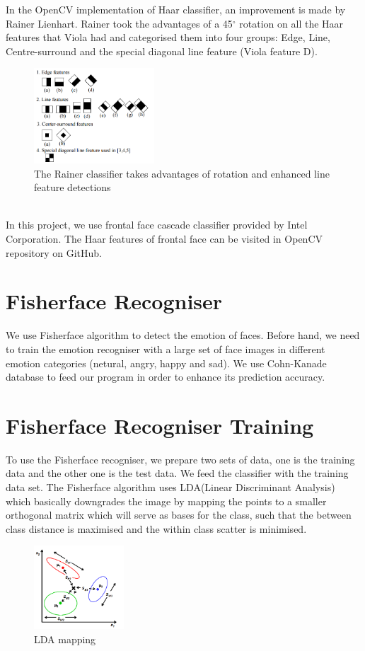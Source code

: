 \documentclass[10pt,a4paper]{article}
\begin{document}
	In the OpenCV implementation of Haar classifier, an improvement is made by Rainer Lienhart. Rainer took the advantages of a 45$^{\circ}$ rotation on all the Haar features
that Viola had and categorised them into four groups: Edge, Line, Centre-surround and the special diagonal line feature (Viola feature D).
	\begin{figure}[!ht]
  	\centering
      	\includegraphics[width=0.4\textwidth]{Rainer_Detector.png}
  	\caption{The Rainer classifier takes advantages of rotation and enhanced line feature detections}
	\end{figure}\\

	In this project, we use frontal face cascade classifier provided by Intel Corporation. The Haar features of frontal face can be visited in OpenCV repository on GitHub.

	\section{Fisherface Recogniser}
	We use Fisherface algorithm to detect the emotion of faces. Before hand, we need to train the emotion recogniser with a large set of face images in different emotion categories (netural, angry, happy and sad). We use Cohn-Kanade database to feed our program in order to enhance its prediction accuracy.

	\section{Fisherface Recogniser Training}
	To use the Fisherface recogniser, we prepare	two sets of data, one is the training data and the other one is the test data. We feed the classifier with the training data set. The Fisherface algorithm uses LDA(Linear Discriminant Analysis) which basically downgrades the image by mapping the points to a smaller orthogonal matrix which will serve as bases for the class, such that the between class distance is maximised and the within class scatter is minimised.
  \begin{figure}[!ht]
  	\centering
      	\includegraphics[width=0.3\textwidth]{fisherface.png}
  	\caption{LDA mapping}
	\end{figure}\\
\end{document}
